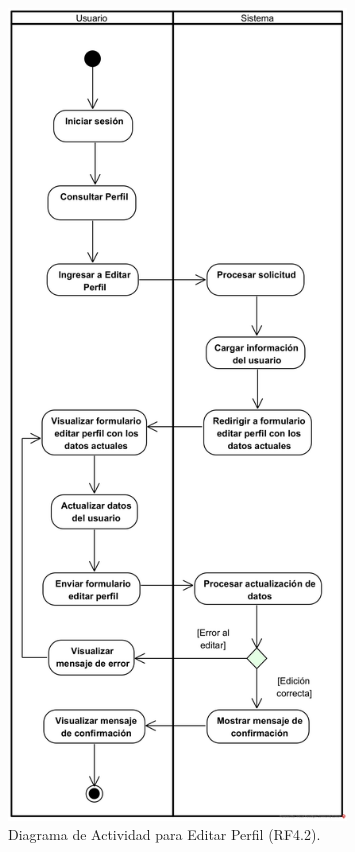\begin{figure}[H]
	\centering
	\caption{Diagrama de Actividad para Editar Perfil (RF4.2).}
 \includegraphics[width=0.8\textwidth]{UML/Actividad/Diagrama de Actividad RF4.2 Editar Perfil.png}
\end{figure}


